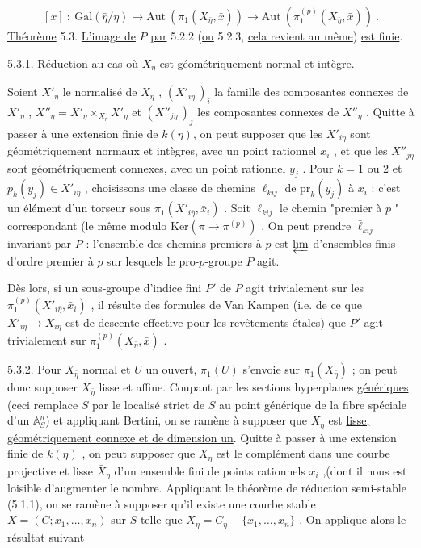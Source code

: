
\begin{equation}\tag{5.2.3}
[x] \ : \ \mathrm{Gal}(\bar{\eta}/\eta) \longrightarrow \mathrm{Aut}\ (\pi_1(X_{\bar{\eta}},\bar{x})) \longrightarrow \mathrm{Aut}\ (\pi_1^{(p)}(X_{\bar{\eta}},\bar{x}))\ .
\end{equation}
\underline{Théorème} 5.3. \underline{L'image de} $P$ \underline{par} 5.2.2 (\underline{ou} 5.2.3, \underline{cela revient au même}) \underline{est finie}.


5.3.1. \underline{Réduction au cas où} $X_\eta$ \underline{est géométriquement normal et intègre.}

Soient $X'_\eta$ le normalisé de $X_\eta$ , $(X'_{i\eta}\,)_i$ la famille des composantes connexes de $X'_\eta$ , $X''_\eta = X'_\eta \times_{X_\eta} X'_\eta$ et $(X''_{j\eta}\,)_j$ les composantes connexes de $X''_\eta$ . Quitte à passer à une extension finie de $k(\eta)$, on peut supposer que les $X'_{i\eta}$ sont géométriquement normaux et intègres, avec un point rationnel $x_i$ , et que les $X''_{j\eta}$ sont géométriquement connexes, avec un point rationnel $y_j$ . Pour $k = 1$ ou $2$ et $p_k(y_j) \in X'_{i\eta}$ , choisissons une classe de chemins $\ell_{kij}$ de $\mathrm{pr}_k(\bar{y}_j)$ à $\bar{x}_i$ : c'est un élément d'un torseur sous $\pi_1(X'_{i\bar{\eta}},\bar{x}_i)$ . Soit $\bar{\ell}_{kij}$ le chemin "premier à $p$ " correspondant (le même modulo $\mathrm{Ker}(\pi \longrightarrow \pi^{(p)})$ . On peut prendre $\bar{\ell}_{kij}$ invariant par $P$ : l'ensemble des chemins premiers à $p$ est $\varprojlim$ d'ensembles finis d'ordre premier à $p$ sur lesquels le pro-$p$-groupe $P$ agit.

Dès lors, si un sous-groupe d'indice fini $P'$ de $P$ agit trivialement sur les $\pi_1^{(p)}(X'_{i\bar{\eta}},\bar{x}_i)$ , il résulte des formules de Van Kampen (i.e. de ce que $X'_{i\bar{\eta}} \longrightarrow X_{i\bar{\eta}}$ est de descente effective pour les revêtements étales) que $P'$ agit trivialement sur $\pi_1^{(p)}(X_{\bar{\eta}},\bar{x})$ .

5.3.2. Pour $X_{\bar{\eta}}$ normal et $U$ un ouvert, $\pi_1(U)$ s'envoie sur $\pi_1(X_{\bar{\eta}})$ ; on peut donc supposer $X_{\bar{\eta}}$ lisse et affine. Coupant par les sections hyperplanes \underline{génériques} (ceci remplace $S$ par le localisé strict de $S$ au point générique de la fibre spéciale d'un $\mathbb{A}^n_S$) et appliquant Bertini, on se ramène à supposer que $X_\eta$ est \underline{lisse, géométriquement connexe et de dimension un}. Quitte à passer à une extension finie de $k(\eta)$ , on peut supposer que $X_\eta$ est le complément dans une courbe projective et lisse $\bar{X}_\eta$ d'un ensemble fini de points rationnels $x_i$ ,(dont il nous est loisible d'augmenter le nombre. Appliquant le théorème de réduction semi-stable (5.1.1), on se ramène à supposer qu'il existe une courbe stable $X = (C ; x_1 ,\ldots, x_n)$ sur $S$ telle que $X_\eta = C_\eta - \{x_1 ,\ldots, x_n\}$ . On applique alors le résultat suivant


